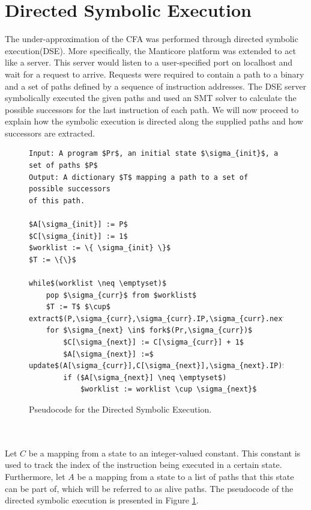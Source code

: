 \documentclass{kththesis}
\newcommand{\fbcomment}[1]{{#1}}
\renewcommand{\fbcomment}[1]{}
\begin{document}
\section{Directed Symbolic Execution}\label{sec:DSEPseudo}
\fbcomment{\color{red}Goal: Describe the theory behind how the directed symbolic execution was performed and how successor to locations were extracted.}
The under-approximation of the CFA was performed through directed symbolic execution(DSE). More specifically, the Manticore platform was extended to act like a server. This server would listen to a user-specified port on localhost and wait for a request to arrive. Requests were required to contain a path to a binary and a set of paths defined by a sequence of instruction addresses. The DSE server symbolically executed the given paths and used an SMT solver to calculate the possible successors for the last instruction of each path. We will now proceed to explain how the symbolic execution is directed along the supplied paths and how successors are extracted.
\begin{figure}[!htbp]
    \centering
\begin{algorithmFrame}
\begin{lstlisting}[style=algorithm]
Input: A program $Pr$, an initial state $\sigma_{init}$, a set of paths $P$
Output: A dictionary $T$ mapping a path to a set of possible successors 
of this path.

$A[\sigma_{init}] := P$
$C[\sigma_{init}] := 1$
$worklist := \{ \sigma_{init} \}$
$T := \{\}$

while$(worklist \neq \emptyset)$
    pop $\sigma_{curr}$ from $worklist$
    $T := T$ $\cup$ extract$(P,\sigma_{curr},\sigma_{curr}.IP,\sigma_{curr}.nextIP,C[\sigma_{curr}])$
    for $\sigma_{next} \in$ fork$(Pr,\sigma_{curr})$
        $C[\sigma_{next}] := C[\sigma_{curr}] + 1$
        $A[\sigma_{next}] :=$ update$(A[\sigma_{curr}],C[\sigma_{next}],\sigma_{next}.IP)$
        if ($A[\sigma_{next}] \neq \emptyset$)
            $worklist := worklist \cup \sigma_{next}$
\end{lstlisting}
\end{algorithmFrame}
\caption[Pseudocode for the Directed Symbolic Execution.]{Pseudocode for the Directed Symbolic Execution.}
    \label{fig:DSEAlgorithm}
\end{figure}
\\ \\
Let $C$ be a mapping from a state to an integer-valued constant. This constant is used to track the index of the instruction being executed in a certain state. Furthermore, let $A$ be a mapping from a state to a list of paths that this state can be part of, which will be referred to as alive paths. The pseudocode of the directed symbolic execution is presented in Figure \ref{fig:DSEAlgorithm}.
\end{document}
